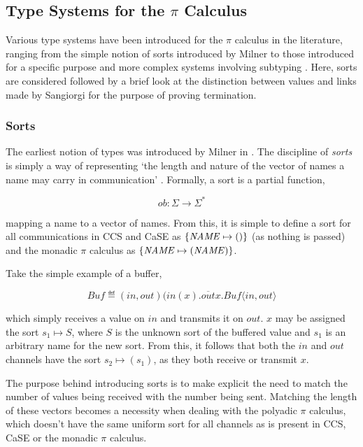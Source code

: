 \subsection{Type Systems for the $\pi$ Calculus}
\label{pitypes}

Various type systems have been introduced for the $\pi$ calculus in
the literature, ranging from the simple notion of sorts introduced by
Milner \cite{milner:pi} to those introduced for a specific purpose
\cite{sangiorgi:types-or} and more complex systems involving subtyping
\cite{sangiorgi:typing}.  Here, sorts are considered followed by a
brief look at the distinction between values and links made by
Sangiorgi \cite{sangiorgi:types-or} for the purpose of proving
termination.

\subsubsection{Sorts}
\label{sorts}

The earliest notion of types was introduced by Milner in
\cite*{milner:93polyadic,milner:pi}.  The discipline of \emph{sorts}
is simply a way of representing `the length and nature of the vector
of names a name may carry in communication' \cite{milner:93polyadic}.
Formally, a sort is a partial function,

\begin{equation}
ob : \Sigma \rightarrow \Sigma^*
\end{equation}

\noindent mapping a name to a vector of names.  From this, it is
simple to define a sort for all communications in CCS and CaSE as
$\{\mathit{NAME} \mapsto ()\}$ (as nothing is passed) and the monadic $\pi$
calculus as $\{\mathit{NAME} \mapsto (\mathit{NAME})\}$.

Take the simple example of a buffer,

\begin{equation}
  Buf \eqdef (in,out)(in(x).\overline{out}x.Buf\langle in,
  out\rangle 
\end{equation}

\noindent which simply receives a value on $in$ and transmits it on
$out$.  $x$ may be assigned the sort $s_1 \mapsto S$, where $S$ is the
unknown sort of the buffered value and $s_1$ is an arbitrary name for
the new sort.  From this, it follows that both the $in$ and $out$
channels have the sort $s_2 \mapsto (s_1)$, as they both receive or
transmit $x$.

The purpose behind introducing sorts is to make explicit the need to
match the number of values being received with the number being sent.
Matching the length of these vectors becomes a necessity when dealing
with the polyadic $\pi$ calculus, which doesn't have the same uniform
sort for all channels as is present in CCS, CaSE or the monadic $\pi$
calculus.

